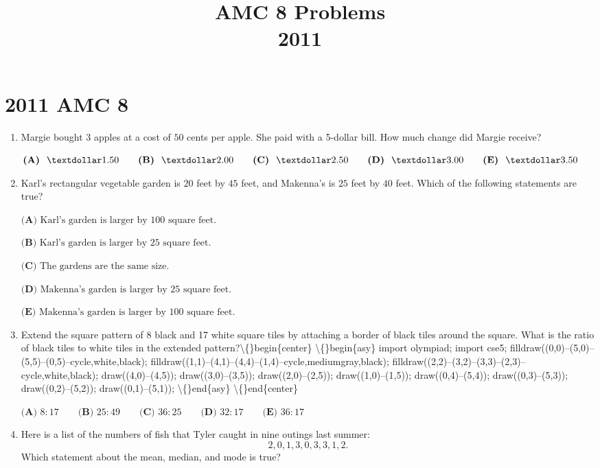 \documentclass{article}
\title{AMC 8 Problems \\ 2011}
\date{}
\begin{document}
\maketitle\thispagestyle{fancy}\newpage\section*{2011 AMC 8}\begin{enumerate}[label=\arabic*., itemsep=0.5em]\item Margie bought \( 3 \) apples at a cost of \( 50 \) cents per apple. She paid with a 5-dollar bill. How much change did Margie receive?

\(\textbf{(A) }\ \textdollar 1.50 \qquad \textbf{(B) }\ \textdollar 2.00 \qquad \textbf{(C) }\ \textdollar 2.50 \qquad \textbf{(D) }\ \textdollar 3.00 \qquad \textbf{(E) }\ \textdollar 3.50\)\par \vspace{0.5em}\item Karl's rectangular vegetable garden is \( 20 \) feet by \( 45 \) feet, and Makenna's is \( 25 \) feet by \( 40 \) feet. Which of the following statements are true?

\(\textbf{(A) }\text{Karl's garden is larger by 100 square feet.}\)

\(\textbf{(B) }\text{Karl's garden is larger by 25 square feet.}\)
 
\(\textbf{(C) }\text{The gardens are the same size.}\) 

\(\textbf{(D) }\text{Makenna's garden is larger by 25 square feet.}\)

\(\textbf{(E) }\text{Makenna's garden is larger by 100 square feet.}\)\par \vspace{0.5em}\item Extend the square pattern of 8 black and 17 white square tiles by attaching a border of black tiles around the square. What is the ratio of black tiles to white tiles in the extended pattern?\textbackslash\{\}begin\{center\}
\textbackslash\{\}begin\{asy\}
import olympiad;
import cse5;
filldraw((0,0)--(5,0)--(5,5)--(0,5)--cycle,white,black);
filldraw((1,1)--(4,1)--(4,4)--(1,4)--cycle,mediumgray,black);
filldraw((2,2)--(3,2)--(3,3)--(2,3)--cycle,white,black);
draw((4,0)--(4,5));
draw((3,0)--(3,5));
draw((2,0)--(2,5));
draw((1,0)--(1,5));
draw((0,4)--(5,4));
draw((0,3)--(5,3));
draw((0,2)--(5,2));
draw((0,1)--(5,1));
\textbackslash\{\}end\{asy\}
\textbackslash\{\}end\{center\}


\( \textbf{(A) }8:17 \qquad\textbf{(B) }25:49 \qquad\textbf{(C) }36:25 \qquad\textbf{(D) }32:17 \qquad\textbf{(E) }36:17\)\par \vspace{0.5em}\item Here is a list of the numbers of fish that Tyler caught in nine outings last summer: 
\begin{equation*}
2,0,1,3,0,3,3,1,2.
\end{equation*}
 Which statement about the mean, median, and mode is true?


\end{enumerate}
\end{document}
